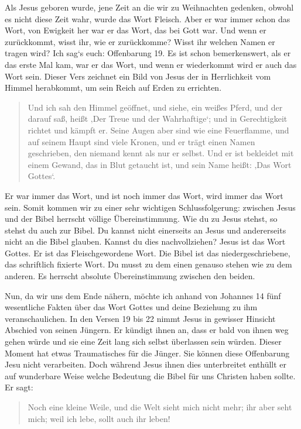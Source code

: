 Als Jesus geboren wurde, jene Zeit an die wir zu Weihnachten gedenken, obwohl es nicht diese Zeit wahr, wurde das Wort Fleisch. 
Aber er war immer schon das Wort, von Ewigkeit her war er das Wort, das bei Gott war. 
Und wenn er zurückkommt, wisst ihr, wie er zurückkomme? 
Wisst ihr welchen Namen er tragen wird? 
Ich sag‘s euch: Offenbarung 19. 
Es ist schon bemerkenswert, als er das erste Mal kam, war er das Wort, und wenn er wiederkommt wird er auch das Wort sein. 
Dieser Vers zeichnet ein Bild von Jesus der in Herrlichkeit vom Himmel herabkommt, um sein Reich auf Erden zu errichten. 

\begin{quotation}
  Und ich sah den Himmel geöffnet, und siehe, ein weißes Pferd, und der darauf saß, heißt ‚Der Treue und der Wahrhaftige‘; und in Gerechtigkeit richtet und kämpft er. Seine Augen aber sind wie eine Feuerflamme, und auf seinem Haupt sind viele Kronen, und er trägt einen Namen geschrieben, den niemand kennt als nur er selbst. 
  Und er ist bekleidet mit einem Gewand, das in Blut getaucht ist, und sein Name heißt: ‚Das Wort Gottes‘.
\end{quotation}

Er war immer das Wort, und ist noch immer das Wort, wird immer das Wort sein. Somit kommen wir zu einer sehr wichtigen Schlussfolgerung: zwischen Jesus und der Bibel herrscht völlige Übereinstimmung. 
Wie du zu Jesus stehst, so stehst du auch zur Bibel. 
Du kannst nicht einerseits an Jesus und andererseits nicht an die Bibel glauben. 
Kannst du dies nachvollziehen? Jesus ist das Wort Gottes. 
Er ist das Fleischgewordene Wort. 
Die Bibel ist das niedergeschriebene, das schriftlich fixierte Wort. 
Du musst zu dem einen genauso stehen wie zu dem anderen. 
Es herrscht absolute Übereinstimmung zwischen den beiden.

Nun, da wir uns dem Ende nähern, möchte ich anhand von Johannes 14 fünf wesentliche Fakten über das Wort Gottes und deine Beziehung zu ihm veranschaulichen. 
In den Versen 19 bis 22 nimmt Jesus in gewisser Hinsicht Abschied von seinen Jüngern. 
Er kündigt ihnen an, dass er bald von ihnen weg gehen würde und sie eine Zeit lang sich selbst überlassen sein würden. 
Dieser Moment hat etwas Traumatisches für die Jünger. 
Sie können diese Offenbarung Jesu nicht verarbeiten. 
Doch während Jesus ihnen dies unterbreitet enthüllt er auf wunderbare Weise welche Bedeutung die Bibel für uns Christen haben sollte. 
Er sagt:

\begin{quotation}
  Noch eine kleine Weile, und die Welt sieht mich nicht mehr; ihr aber seht mich; weil ich lebe, sollt auch ihr leben!
\end{quotation}

